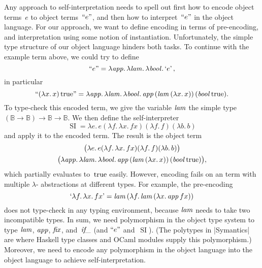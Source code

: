 \documentclass[preprint]{sigplanconf}
\newcommand{\BB}{\mathbb{B}}
\newcommand{\fun}[1]{\mathopen{\lambda\mathord{#1}.\,}}
\newcommand{\True}{\mathinner{\mathrm{true}}}
\newcommand{\Encode}[1]{\mathinner{\mathopen{\text{``}}#1\mathclose{\text{''}}}}
\newcommand{\encode}[1]{\mathinner{\mathopen{\text{`}}#1\mathclose{\text{'}}}}
\newcommand{\ident}[1]{\mathinner{\text{\textit{#1\/}}}}
\DeclareMathOperator{\si}{SI}
\begin{document}
Any approach to self\hyp interpretation needs to spell out first how to
encode object terms~$e$ to object terms~$\Encode{e}$, and then how to
interpret~$\Encode{e}$ in the object language.  For our approach, we
want to define encoding in terms of pre-encoding, and interpretation
using some notion of instantiation.  Unfortunately, the simple type
structure of our object language hinders both tasks.  To continue with
the example term above, we could try to define
\begin{equation*}
    \Encode{e} =
    \fun{\ident{app}} \fun{\ident{lam}} \fun{\ident{bool}} \encode{e},
\end{equation*}
in particular
\begin{equation*}
    \Encode{(\fun{x}x)\True} =
    \fun{\ident{app}} \fun{\ident{lam}} \fun{\ident{bool}}
    \ident{app} (\ident{lam} (\fun{x} x))\, (\ident{bool} \True).
\end{equation*}
To type-check this encoded term, we give the variable $\ident{lam}$ the
simple type $(\BB\to\BB)\to\BB\to\BB$.
We then define the self\hyp interpreter
\begin{equation*}
    \si = \fun{e} e
    (\fun{f} \fun{x} fx)
    (\fun{f} f)
    (\fun{b} b)
\end{equation*}
and apply it to the encoded term.  The result is the object term
\begin{multline*}
    \bigl(\fun{e} e (\fun{f} \fun{x} fx) (\fun{f} f) (\fun{b} b)\bigr)
\\
    \bigl(
    \fun{\ident{app}} \fun{\ident{lam}} \fun{\ident{bool}}
    \ident{app} (\ident{lam} (\fun{x} x))\, (\ident{bool} \True)
    \bigr),
\end{multline*}
which partially evaluates to~$\True$ easily.
However, encoding fails on an term with multiple $\lambda$\hyp
abstractions at different types.  For example, the pre-encoding
\begin{equation*}
    \encode{\fun{f}\fun{x}fx}
    = \ident{lam} (\fun{f} \ident{lam} (\fun{x} \ident{app} f x))
\end{equation*}
does not type-check in any typing environment, because $\ident{lam}$ needs
to take two incompatible types.  In sum, we need polymorphism in the
object type system to type $\ident{lam}$, $\ident{app}$, $\ident{fix}$,
and~$\ident{if\_}$ (and $\Encode{e}$ and~$\si$).
(The polytypes in |Symantics| are where Haskell type classes and OCaml
modules supply this polymorphism.)  Moreover, we need to encode any
polymorphism in the object language into the object language to achieve
self\hyp interpretation.
\end{document}
